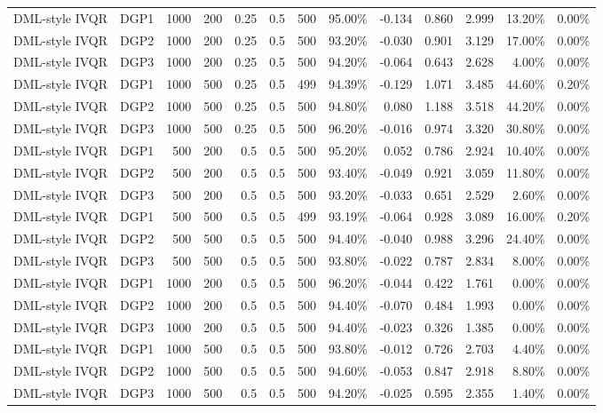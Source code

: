 \begin{landscape}
\begin{longtable}{llrrrrrrrrrrr}
DML-style IVQR & DGP1 & 1000 & 200 & 0.25 & 0.5 & 500 & 95.00\% & -0.134 & 0.860 & 2.999 & 13.20\% & 0.00\% \\
DML-style IVQR & DGP2 & 1000 & 200 & 0.25 & 0.5 & 500 & 93.20\% & -0.030 & 0.901 & 3.129 & 17.00\% & 0.00\% \\
DML-style IVQR & DGP3 & 1000 & 200 & 0.25 & 0.5 & 500 & 94.20\% & -0.064 & 0.643 & 2.628 & 4.00\% & 0.00\% \\
DML-style IVQR & DGP1 & 1000 & 500 & 0.25 & 0.5 & 499 & 94.39\% & -0.129 & 1.071 & 3.485 & 44.60\% & 0.20\% \\
DML-style IVQR & DGP2 & 1000 & 500 & 0.25 & 0.5 & 500 & 94.80\% & 0.080 & 1.188 & 3.518 & 44.20\% & 0.00\% \\
DML-style IVQR & DGP3 & 1000 & 500 & 0.25 & 0.5 & 500 & 96.20\% & -0.016 & 0.974 & 3.320 & 30.80\% & 0.00\% \\
DML-style IVQR & DGP1 & 500 & 200 & 0.5 & 0.5 & 500 & 95.20\% & 0.052 & 0.786 & 2.924 & 10.40\% & 0.00\% \\
DML-style IVQR & DGP2 & 500 & 200 & 0.5 & 0.5 & 500 & 93.40\% & -0.049 & 0.921 & 3.059 & 11.80\% & 0.00\% \\
DML-style IVQR & DGP3 & 500 & 200 & 0.5 & 0.5 & 500 & 93.20\% & -0.033 & 0.651 & 2.529 & 2.60\% & 0.00\% \\
DML-style IVQR & DGP1 & 500 & 500 & 0.5 & 0.5 & 499 & 93.19\% & -0.064 & 0.928 & 3.089 & 16.00\% & 0.20\% \\
DML-style IVQR & DGP2 & 500 & 500 & 0.5 & 0.5 & 500 & 94.40\% & -0.040 & 0.988 & 3.296 & 24.40\% & 0.00\% \\
DML-style IVQR & DGP3 & 500 & 500 & 0.5 & 0.5 & 500 & 93.80\% & -0.022 & 0.787 & 2.834 & 8.00\% & 0.00\% \\
DML-style IVQR & DGP1 & 1000 & 200 & 0.5 & 0.5 & 500 & 96.20\% & -0.044 & 0.422 & 1.761 & 0.00\% & 0.00\% \\
DML-style IVQR & DGP2 & 1000 & 200 & 0.5 & 0.5 & 500 & 94.40\% & -0.070 & 0.484 & 1.993 & 0.00\% & 0.00\% \\
DML-style IVQR & DGP3 & 1000 & 200 & 0.5 & 0.5 & 500 & 94.40\% & -0.023 & 0.326 & 1.385 & 0.00\% & 0.00\% \\
DML-style IVQR & DGP1 & 1000 & 500 & 0.5 & 0.5 & 500 & 93.80\% & -0.012 & 0.726 & 2.703 & 4.40\% & 0.00\% \\
DML-style IVQR & DGP2 & 1000 & 500 & 0.5 & 0.5 & 500 & 94.60\% & -0.053 & 0.847 & 2.918 & 8.80\% & 0.00\% \\
DML-style IVQR & DGP3 & 1000 & 500 & 0.5 & 0.5 & 500 & 94.20\% & -0.025 & 0.595 & 2.355 & 1.40\% & 0.00\% \\

\end{longtable}
\end{landscape}
